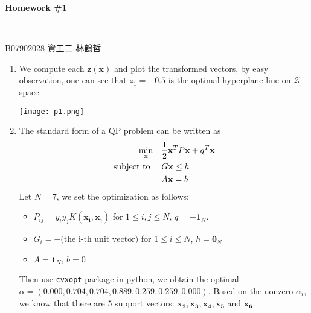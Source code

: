 \documentclass{article}
\begin{document}
\begin{CJK*}{UTF8}{bsmi}
    \begin{center}
        \begin{Large} \textbf{Homework \#1} \end{Large}
        \\[10pt]
        \begin{large} B07902028 \enspace 資工二 \enspace 林鶴哲 \end{large}
    \end{center}
    \begin{normalsize}
    \begin{enumerate}[label=\textbf{\arabic*}.]
        \item We compute each $\mathbf{z}(\mathbf{x})$ and plot the transformed vectors, by easy observation, one can see that $z_1 = -0.5$ is the optimal hyperplane line on $\mathcal{Z}$ space.
        \begin{center} \texttt{[image: p1.png]}
        \end{center}
        
        \item The standard form of a QP problem can be written as
        \[ \begin{aligned} \min_{\mathbf{x}}\enspace \enspace &  \frac{1}{2}\mathbf{x}^TP\mathbf{x} + q^T\mathbf{x}\\
        \text{subject to \enspace \enspace}& G\mathbf{x} \le h\\
        &A\mathbf{x} = b\end{aligned}\]
        Let $N = 7$, we set the optimization as follows:
        \begin{itemize}
            \item $P_{ij} = y_iy_jK(\mathbf{x_i}, \mathbf{x_j})$ for $1 \le i, j \le N$, $q = \mathbf{-1}_N$.
            \item $G_i = - \text{(the i-th unit vector)}$ for $1 \le i \le N$, $h = \mathbf{0}_N$
            \item $A = \mathbf{1}_N$, $b = 0$
        \end{itemize}
        Then use \verb|cvxopt| package in python, we obtain the optimal $\alpha = (0.000,0.704,0.704,0.889,0.259,0.259,0.000)$.
        Based on the nonzero $\alpha_i$, we know that there are 5 support vectors: $\mathbf{x_2}, \mathbf{x_3}, \mathbf{x_4}, \mathbf{x_5}$ and $\mathbf{x_6}$.
        

\end{enumerate}
\end{normalsize}
\end{CJK*}
\end{document}
